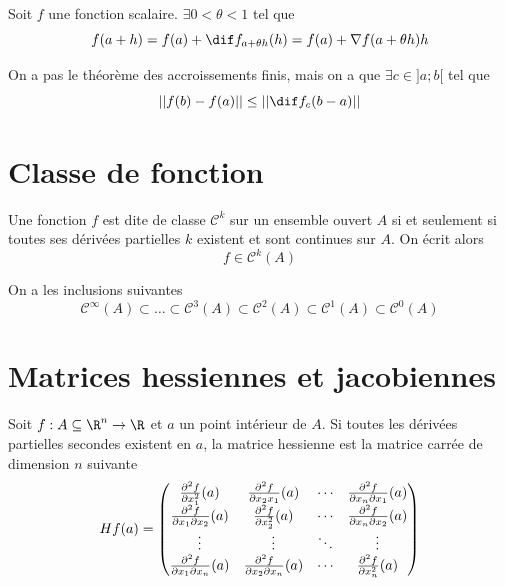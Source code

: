 \begin{mytheo} Soit $f$ une fonction scalaire. $\exists 0 < \theta < 1$ tel que
	\[ f(a+h) = f(a) + \dif f_{a + \theta h}(h) = f(a) + \nabla f(a + \theta h)h \]
\end{mytheo}

\begin{myprop}
	On a pas le théorème des accroissements finis, mais on a que
	$\exists c \in ]a; b[$ tel que
	\[ || f(b) - f(a) || \leq || \dif f_c(b-a) || \]
\end{myprop}


\section{Classe de fonction}

\begin{mydef}
	Une fonction $f$ est dite de classe $\mathcal{C}^k$ sur un ensemble ouvert $A$ si et seulement si toutes ses dérivées partielles $k$\ieme{} existent et sont continues sur $A$. On écrit alors
	\[ f \in \mathcal{C}^k(A) \]
\end{mydef}

\begin{myprop} On a les inclusions suivantes
	\[ \mathcal{C}^{\infty}(A) \subset \dots \subset \mathcal{C}^3(A) \subset \mathcal{C}^2(A) \subset \mathcal{C}^1(A) \subset \mathcal{C}^0(A) \]
\end{myprop}


\section{Matrices hessiennes et jacobiennes}

\begin{mydef}
	Soit $f : A \subseteq \R^n \to \R$ et $a$ un point intérieur de $A$. Si toutes les dérivées partielles secondes existent en $a$, la matrice hessienne est la matrice carrée de dimension $n$ suivante
	\[ Hf(a) = \begin{pmatrix}
		\frac{\partial^2 f}{\partial x_1^2}(a) & \frac{\partial^2 f}{\partial x_2 x_1}(a) & \cdots & \frac{\partial^2 f}{\partial x_n \partial x_1}(a) \\
		\frac{\partial^2 f}{\partial x_1 \partial x_2}(a) & \frac{\partial^2 f}{\partial x_2^2}(a) & \cdots & \frac{\partial^2 f}{\partial x_n \partial x_2}(a) \\
		\vdots & \vdots & \ddots & \vdots \\
		\frac{\partial^2 f}{\partial x_1 \partial x_n}(a) & \frac{\partial^2 f}{\partial x_2 \partial x_n}(a) & \cdots & \frac{\partial^2 f}{\partial x_n^2}(a) \\
	\end{pmatrix} \]
\end{mydef}

